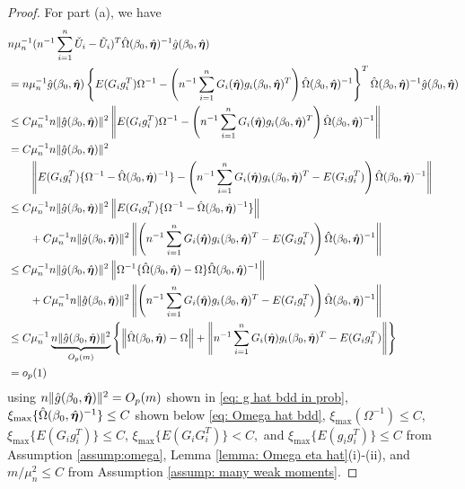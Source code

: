 \documentclass[12pt]{article}
\begin{document}
{\begin{proof}
For part (a), we have 
\begin{align*}
     &n\mu_n^{-1}( n^{-1} \sum_{i=1}^n \check U_i- \tilde U_i)^T \hat \Omega(\beta_0,\hat{\bm \eta})^{-1} \hat g(\beta_0,\hat{\bm \eta})\\
     &= n\mu_n^{-1} \hat g(\beta_0,\hat{\bm \eta}) \left\{E(G_ig_i^T) \Omega^{-1}- \left(n^{-1} \sum_{i=1}^n G_i(\hat{\bm \eta} ) g_i(\beta_0, \hat{\bm \eta})^T \right) \hat\Omega(\beta_0,\hat{\bm \eta})^{-1}  \right\}^T \hat \Omega(\beta_0,\hat{\bm \eta})^{-1} \hat g(\beta_0,\hat{\bm \eta}) \\
     &\leq  C \mu_n^{-1} n \|\hat g(\beta_0,\hat{\bm \eta})\|^2 \left\|E(G_ig_i^T) \Omega^{-1}- \left(n^{-1} \sum_{i=1}^n G_i(\hat{\bm \eta} ) g_i(\beta_0, \hat{\bm \eta})^T \right) \hat\Omega(\beta_0,\hat{\bm \eta})^{-1}  \right \|\\
     &=    C \mu_n^{-1} n \|\hat g(\beta_0,\hat{\bm \eta})\|^2 \\
     &\qquad \left\|E(G_ig_i^T) \{\Omega^{-1} - \hat\Omega(\beta_0,\hat {\bm \eta})^{-1} \}- \left(n^{-1} \sum_{i=1}^n G_i(\hat{\bm \eta} ) g_i(\beta_0, \hat{\bm \eta})^T -E(G_ig_i^T)   \right) \hat\Omega(\beta_0,\hat{\bm \eta})^{-1}  \right \| \\
     &\leq  C \mu_n^{-1} n \|\hat g(\beta_0,\hat{\bm \eta})\|^2  \left\|E(G_ig_i^T) \{\Omega^{-1} - \hat\Omega(\beta_0,\hat {\bm \eta})^{-1} \}\right\| \\
     &\qquad+C \mu_n^{-1} n \|\hat g(\beta_0,\hat{\bm \eta})\|^2  \left\| \left(n^{-1} \sum_{i=1}^n G_i(\hat{\bm \eta} ) g_i(\beta_0, \hat{\bm \eta})^T -E(G_ig_i^T)   \right) \hat\Omega(\beta_0,\hat{\bm \eta})^{-1}  \right \| \\
       &\leq  C \mu_n^{-1} n \|\hat g(\beta_0,\hat{\bm \eta})\|^2  \left\|  \Omega^{-1}  \{\hat\Omega(\beta_0,\hat {\bm \eta}) - \Omega \}\hat\Omega(\beta_0,\hat {\bm \eta})^{-1}  \right\| \\
     &\qquad+C \mu_n^{-1} n \|\hat g(\beta_0,\hat{\bm \eta})\|^2 \left\| \left(n^{-1} \sum_{i=1}^n G_i(\hat{\bm \eta} ) g_i(\beta_0, \hat{\bm \eta})^T -E(G_ig_i^T)   \right) \hat\Omega(\beta_0,\hat{\bm \eta})^{-1}  \right \| \\
        &\leq  C \mu_n^{-1} \underbrace{n \|\hat g(\beta_0,\hat{\bm \eta})\|^2}_{O_p(m)} \left\{ \left\|   \hat\Omega(\beta_0,\hat {\bm \eta}) - \Omega  \right\| + \left\| n^{-1} \sum_{i=1}^n G_i(\hat{\bm \eta} ) g_i(\beta_0, \hat{\bm \eta})^T -E(G_ig_i^T)    \right \| \right\}\\
     &=o_p(1)
\end{align*}
 using $ n \|\hat g(\beta_0,\hat{\bm \eta})\|^2= O_p(m) $ shown in   \eqref{eq: g hat bdd in prob},  $ \xi_{\max} \{ \hat\Omega(\beta_0, \hat {\bm \eta})^{-1} \}\leq C  $ shown below \eqref{eq: Omega hat bdd}, $ \xi_{\max} ( \Omega^{-1} )\leq C  $, 
 $\xi_{\max}\{E(G_ig_i^T)\} \leq C  $,  $ \xi_{\max}  \{  E(G_iG_i^T) \}< C,$ and $ \xi_{\max} \{ E(g_ig_i^T)\}\leq C$ from Assumption \ref{assump:omega},   Lemma \ref{lemma: Omega eta hat}(i)-(ii), and  $m/\mu_n^2\leq C$ from Assumption  \ref{assump: many weak moments}. 


\end{proof}}
\end{document}
